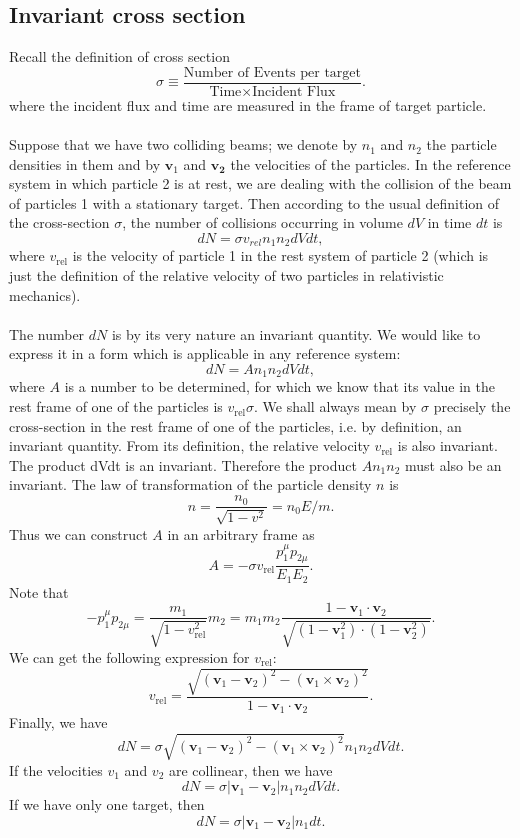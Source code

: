 \subsection{Invariant cross section}
Recall the definition of cross section
\[\sigma \equiv \frac{\mbox{Number of Events per target}}{\mbox{Time} \times \mbox{Incident Flux}}.\]
where the incident flux and time are measured in the frame of target particle.
\\ \\
Suppose that we have two colliding beams; we denote by $n_1$ and $n_2$ the particle densities in them and by $\bm{v}_1$ and $\bm{v_2}$ the velocities of the particles. In the reference system in which particle 2 is at rest, we are dealing with the collision of the beam of particles 1 with a stationary target. Then according to the usual definition of the cross-section $\sigma$, the number of collisions occurring in volume $dV$ in time $dt$ is 
\[dN = \sigma v_{rel} n_1 n_2 dV dt,\]
where $v_{\mathrm{rel}}$ is the velocity of particle 1 in the rest system of particle 2 (which is just the definition of the relative velocity of two particles in relativistic mechanics). 
\\ \\
The number $dN$ is by its very nature an invariant quantity. We would like to express it in a form which is applicable in any reference system: 
\[dN = A n_1 n_2 dV dt,\] 
where $A$ is a number to be determined, for which we know that its value in the rest frame of one of the particles is $v_{\mathrm{rel}} \sigma$. We shall always mean by $\sigma$ precisely the cross-section in the rest frame of one of the particles, i.e. by definition, an invariant quantity. From its definition, the relative velocity $v_{\mathrm{rel}}$ is also invariant. The product dVdt is an invariant. Therefore the product $A n_1 n_2$ must also be an invariant. The law of transformation of the particle density $n$ is
\[n = \frac{n_0}{\sqrt{1-v^2}} = n_0 E/m.\]
Thus we can construct $A$ in an arbitrary frame as
\[A = -\sigma v_{\mathrm{rel}} \frac{p_1^{\mu}p_{2\mu}}{E_1 E_2}.\]
Note that
\[-p_1^{\mu}p_{2\mu} = \frac{m_1}{\sqrt{1-v_{\mathrm{rel}}^2}}m_2 = m_1 m_2 \frac{1-\bm{v}_1\cdot\bm{v}_2}{\sqrt{(1-\bm{v}_1^2)\cdot(1-\bm{v}_2^2)}}.\]
We can get the following expression for $v_{\mathrm{rel}}$:
\[v_{\mathrm{rel}} = \frac{\sqrt{(\bm{v}_1-\bm{v}_2)^2-(\bm{v}_1\times\bm{v}_2)^2}}{1-\bm{v}_1\cdot\bm{v}_2}.\]
Finally, we have
\[dN = \sigma \sqrt{(\bm{v}_1-\bm{v}_2)^2-(\bm{v}_1\times\bm{v}_2)^2} n_1 n_2 dV dt.\]
If the velocities $v_1$ and $v_2$ are collinear, then we have
\[dN = \sigma |\bm{v}_1 - \bm{v}_2| n_1 n_2 dV dt.\]
If we have only one target, then
\[dN = \sigma |\bm{v}_1 - \bm{v}_2| n_1 dt.\]

